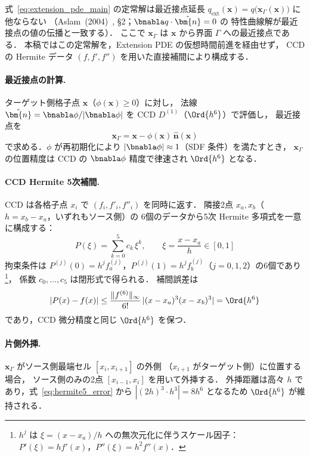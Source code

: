 式~\eqref{eq:extension_pde_main} の定常解は最近接点延長
$q_\mathrm{ext}(\bm{x}) = q\bigl(\bm{x}_\Gamma(\bm{x})\bigr)$ に他ならない
（Aslam~(2004)~\cite{Aslam2004}, §2；$\bnabla q \cdot \hat{\bm{n}} = 0$ の
特性曲線解が最近接点の値の伝播と一致する）．
ここで $\bm{x}_\Gamma$ は $\bm{x}$ から界面 $\Gamma$ への最近接点である．
本稿ではこの定常解を，Extension PDE の仮想時間前進を経由せず，
CCD の Hermite データ $(f, f', f'')$ を用いた直接補間により構成する．

\paragraph{最近接点の計算.}
ターゲット側格子点 $\bm{x}$（$\phi(\bm{x}) \geq 0$）に対し，
法線 $\hat{\bm{n}} = \bnabla\phi/|\bnabla\phi|$ を CCD $D^{(1)}$（$\Ord{h^6}$）で評価し，
最近接点を
\begin{equation}
  \bm{x}_\Gamma = \bm{x} - \phi(\bm{x})\,\hat{\bm{n}}(\bm{x})
  \label{eq:closest_point}
\end{equation}
で求める．$\phi$ が再初期化により $|\bnabla\phi| \approx 1$（SDF 条件）を満たすとき，
$\bm{x}_\Gamma$ の位置精度は CCD の $\bnabla\phi$ 精度で律速され $\Ord{h^6}$ となる．

\paragraph{CCD Hermite 5次補間.}
CCD は各格子点 $x_i$ で $(f_i, f'_i, f''_i)$ を同時に返す．
隣接2点 $x_a, x_b$（$h = x_b - x_a$，いずれもソース側）の
6個のデータから5次 Hermite 多項式を一意に構成する：
\begin{equation}
  P(\xi) = \sum_{k=0}^{5} c_k \,\xi^k, \qquad \xi = \frac{x - x_a}{h} \in [0,1]
  \label{eq:hermite5}
\end{equation}
拘束条件は $P^{(j)}(0) = h^j f_a^{(j)}$，$P^{(j)}(1) = h^j f_b^{(j)}$（$j = 0,1,2$）の6個であり%
\footnote{$h^j$ は $\xi = (x-x_a)/h$ への無次元化に伴うスケール因子：
$P'(\xi) = h f'(x)$，$P''(\xi) = h^2 f''(x)$．}，
係数 $c_0,\ldots,c_5$ は閉形式で得られる．
補間誤差は
\begin{equation}
  |P(x) - f(x)| \leq \frac{\|f^{(6)}\|_\infty}{6!}\,|(x-x_a)^3(x-x_b)^3| = \Ord{h^6}
  \label{eq:hermite5_error}
\end{equation}
であり，CCD 微分精度と同じ $\Ord{h^6}$ を保つ．

\paragraph{片側外挿.}
$\bm{x}_\Gamma$ がソース側最端セル $[x_i, x_{i+1}]$ の外側
（$x_{i+1}$ がターゲット側）に位置する場合，
ソース側のみの2点 $[x_{i-1}, x_i]$ を用いて外挿する．
外挿距離は高々 $h$ であり，式~\eqref{eq:hermite5_error} から
$|(2h)^3 \cdot h^3| = 8h^6$ となるため $\Ord{h^6}$ が維持される．

